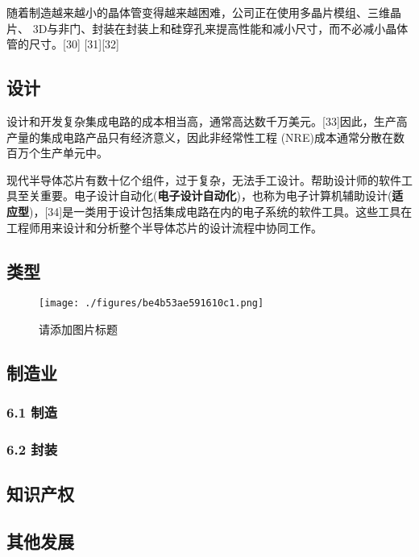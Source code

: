 随着制造越来越小的晶体管变得越来越困难，公司正在使用多晶片模组、三维晶片、 3D与非门、封装在封装上和硅穿孔来提高性能和减小尺寸，而不必减小晶体管的尺寸。[30] [31][32]

\subsection{设计}

设计和开发复杂集成电路的成本相当高，通常高达数千万美元。[33]因此，生产高产量的集成电路产品只有经济意义，因此非经常性工程 (NRE)成本通常分散在数百万个生产单元中。

现代半导体芯片有数十亿个组件，过于复杂，无法手工设计。帮助设计师的软件工具至关重要。电子设计自动化(\textbf{电子设计自动化})，也称为电子计算机辅助设计(\textbf{适应型})，[34]是一类用于设计包括集成电路在内的电子系统的软件工具。这些工具在工程师用来设计和分析整个半导体芯片的设计流程中协同工作。

\subsection{类型}

\begin{figure}[ht]
\centering
\texttt{[image: ./figures/be4b53ae591610c1.png]}
\caption{请添加图片标题} \label{fig_icJCDL_3}
\end{figure}


\subsection{制造业}



\subsubsection{6.1 制造}



\subsubsection{6.2 封装}



\subsection{知识产权}



\subsection{其他发展}



